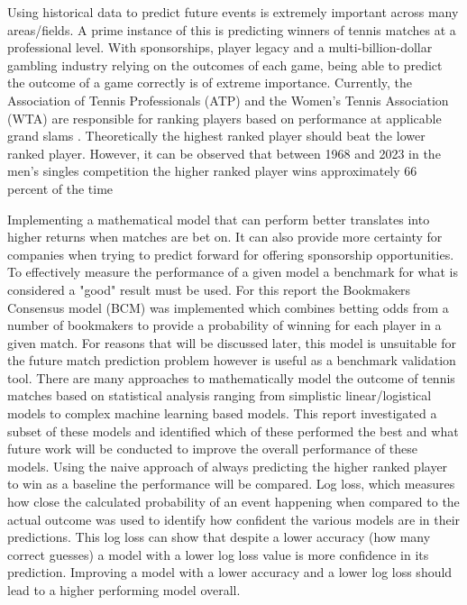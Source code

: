 \documentclass[12pt,a4paper]{article}
\begin{document}
Using historical data to predict future events is extremely important across many
areas/fields. A prime instance of this is predicting winners of tennis matches at
a professional level. With sponsorships, player legacy and a multi-billion-dollar
gambling industry relying on the outcomes of each game, being able to predict the
outcome of a game correctly is of extreme importance. Currently, the
Association of Tennis Professionals (ATP) and the Women's Tennis Association
(WTA) are responsible for ranking players based on performance at applicable
grand slams \cite{nag_tennis_2022}.  Theoretically the highest ranked player should beat
the lower ranked player. However, it can be observed that between 1968 and 2023
in the men's singles competition the higher ranked player wins approximately 66
percent of the time

Implementing a mathematical model that can perform better translates into higher
returns when matches are bet on. It can also provide more certainty for companies
when trying to
predict forward for offering sponsorship opportunities. To effectively measure
the performance of a given model a benchmark for what is considered a "good" result
must be used. For this report the Bookmakers Consensus model (BCM) was implemented which
combines betting odds from a number of bookmakers to provide a probability of winning
for each player in a given match. For reasons that will be discussed later, this
model is unsuitable for the future match prediction problem however is useful as a
benchmark validation tool.
There are many approaches to mathematically model the outcome of tennis matches based on statistical analysis
ranging from simplistic linear/logistical models to complex machine learning
based models. This report investigated a subset of these models and identified
which of these performed the best and what future work will be conducted to
improve the overall performance of these models. Using the naive approach of
always predicting the higher ranked player to win as a baseline the performance
will be compared. Log loss, which measures how close the calculated probability
of an event happening when compared to the actual outcome was used to identify
how confident the various models are in their predictions. This log loss can show
that despite a lower accuracy (how many correct guesses) a model with a lower
log loss value is more confidence in its prediction. Improving a model with a lower
accuracy and a lower log loss should lead to a higher performing model overall.
\noindent \hrulefill
\end{document}
